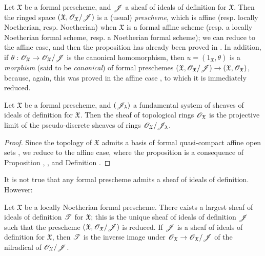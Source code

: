 \begin{env}[10.5.2]
\label{I.10.5.2}
Let $\mathfrak{X}$ be a formal prescheme, and $\mathscr{J}$ a sheaf of ideals of definition for $\mathfrak{X}$.
Then the ringed space $(\mathfrak{X},\mathscr{O}_\mathfrak{X}/\mathscr{J})$ is a (usual) \emph{prescheme}, which is affine (resp. locally Noetherian, resp. Noetherian) when $\mathfrak{X}$ is a formal affine scheme (resp. a locally Noetherian formal scheme, resp. a Noetherian formal scheme);  we can reduce to the affine case, and then the proposition has already been proved in .
In addition, if $\theta:\sh{O}_\mathfrak{X}\to\sh{O}_\mathfrak{X}/\sh{J}$ is the canonical homomorphism, then $u=(1_\mathfrak{X},\theta)$ is a \emph{morphism} (said to be \emph{canonical}) of formal preschemes $(\mathfrak{X},\sh{O}_\mathfrak{X}/\sh{J})\to(\mathfrak{X},\sh{O}_\mathfrak{X})$, because, again, this was proved in the affine case , to which it is immediately reduced.
\end{env}

\begin{proposition}[10.5.3]
\label{I.10.5.3}
Let $\mathfrak{X}$ be a formal prescheme, and $(\mathscr{J}_\lambda)$ a fundamental system of sheaves of ideals of definition for $\mathfrak{X}$.
Then the sheaf of topological rings $\mathscr{O}_\mathfrak{X}$ is the projective limit of the pseudo-discrete sheaves of rings  $\mathscr{O}_\mathfrak{X}/\mathscr{J}_\lambda$.
\end{proposition}

\begin{proof}
Since the topology of $\mathfrak{X}$ admits a basis of formal quasi-compact affine open sets , we reduce to the affine case, where the proposition is a consequence of Proposition , , and Definition .
\end{proof}

It is not true that any formal prescheme admits a sheaf of ideals of definition.
However:
\begin{proposition}[10.5.4]
\label{I.10.5.4}
Let $\mathfrak{X}$ be a locally Noetherian formal prescheme.
There exists a largest sheaf of ideals of definition $\mathscr{T}$ for $\mathfrak{X}$; this is the unique sheaf of ideals of definition $\mathscr{J}$ such that the prescheme $(\mathfrak{X},\mathscr{O}_\mathfrak{X}/\mathscr{J})$ is reduced.
If $\mathscr{J}$ is a sheaf of ideals of definition for $\mathfrak{X}$, then $\mathscr{T}$ is the inverse image under $\sh{O}_\mathfrak{X}\to\sh{O}_\mathfrak{X}/\sh{J}$ of the nilradical of $\mathscr{O}_\mathfrak{X}/\mathscr{J}$.
\end{proposition}

